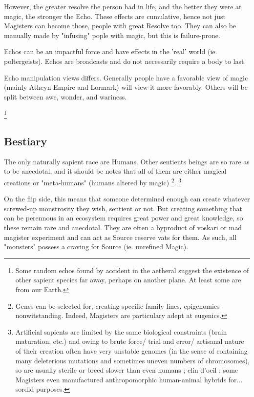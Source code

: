 However, the greater resolve the person had in life, and the better they were at magic, the stronger the Echo. These effects are cumulative, hence not just Magisters can become those, people with great Resolve too. They can also be manually made by "infusing" pople with magic, but this is failure-prone.
     
Echos can be an impactful force and have effects in the 'real' world (ie. poltergeists). Echos are broadcasts and do not necessarily require a body to last.
    
Echo manipulation views differs. Generally people have a favorable view of magic (mainly Atheyn Empire and Lormark) will view it more favorably. Others will be split between awe, wonder, and wariness.

\footnote{Some random echos found by accident in the aetheral suggest the existence of other sapient species far away, perhaps on another plane. At least some are from our Earth.}


\subsection{Bestiary}



The only naturally sapient race are Humans. Other sentients beings are so rare as to be anecdotal, and it should be notes that all of them are either magical creations or "meta-humans" (humans altered by magic)
\footnote{Genes can be selected for, creating specific family lines, epigenomics nonwitstanding. Indeed, Magisters are particulary adept at eugenics.}. \footnote{Artificial sapients are limited by the same biological constraints (brain maturation, etc.) and owing to brute force/ trial and error/ artisanal  nature of their creation often have very unstable genomes (in the sense of containing many deleterious mutations and sometimes uneven numbers of chromosomes), so are usually sterile or breed slower than even humans ; clin d'oeil : some Magisters even manufactured anthropomorphic human-animal hybrids for... sordid purposes.}

On the flip side, this means that someone determined enough can create whatever screwed-up monstrosity they wish, sentient or not. But creating something that can be perennous in an ecosystem requires great power and great knowledge, so these remain rare and anecdotal. They are often a byproduct of voskari or mad magister experiment and can act as Source reserve vats for them. As such, all "monsters" possess a craving for Source (ie. unrefined Magic).


